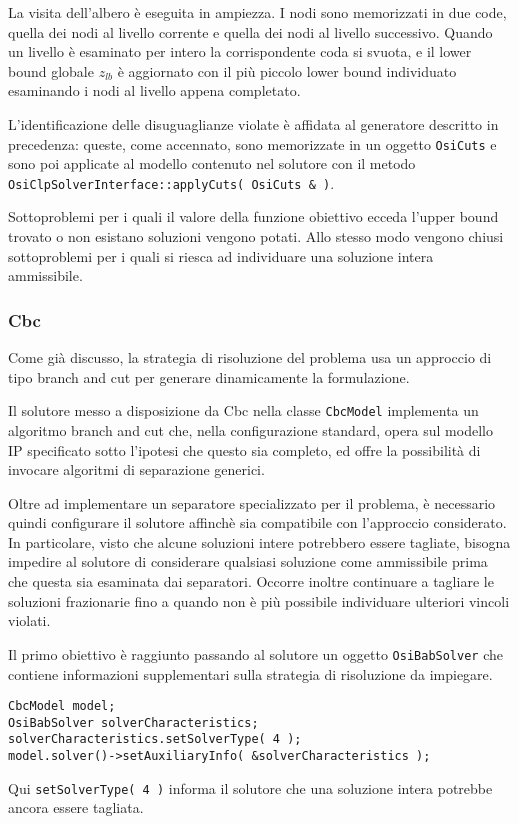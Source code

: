 \documentclass[11pt,oneside,a4paper]{article}
\begin{document}
La visita dell'albero è eseguita in ampiezza. I nodi sono
memorizzati in due code, quella dei nodi al livello corrente e quella dei nodi al livello
successivo. Quando un livello è esaminato per intero la corrispondente coda si svuota, e il lower bound
globale $z_{lb}$ è aggiornato con il più piccolo lower bound individuato esaminando i nodi al livello
appena completato.

L'identificazione delle disuguaglianze violate è affidata al generatore descritto in precedenza: 
queste, come accennato, sono memorizzate in un oggetto \texttt{OsiCuts} e sono poi applicate al modello
contenuto nel solutore con il metodo \texttt{Osi\-Clp\-Solver\-In\-ter\-fa\-ce::ap\-plyCuts( OsiCuts \& )}.

Sottoproblemi per i quali il valore della funzione obiettivo ecceda l'upper bound trovato
o non esistano soluzioni vengono potati. Allo stesso modo vengono chiusi sottoproblemi per
i quali si riesca ad individuare una soluzione intera ammissibile.

\subsubsection{Cbc}
Come già discusso, la strategia di risoluzione del problema usa un approccio di tipo branch and
cut per generare dinamicamente la formulazione.

Il solutore messo a disposizione da Cbc nella classe \texttt{CbcModel} implementa un algoritmo branch and cut
che, nella configurazione standard, opera sul modello IP specificato sotto l'ipotesi che questo sia
completo, ed offre la possibilità di invocare algoritmi di separazione generici.

Oltre ad implementare un separatore specializzato per il problema, è necessario quindi configurare il
solutore affinchè sia compatibile con l'approccio considerato. In particolare, visto che alcune
soluzioni intere potrebbero essere tagliate, bisogna impedire al solutore di considerare qualsiasi
soluzione come ammissibile prima che questa sia esaminata dai separatori. Occorre inoltre
continuare a tagliare le soluzioni frazionarie fino a quando non è più possibile
individuare ulteriori vincoli violati.

Il primo obiettivo è raggiunto passando al solutore un oggetto \texttt{OsiBabSol\-ver} che
contiene informazioni supplementari sulla strategia di risoluzione da impiegare.

\begin{verbatim}
CbcModel model;
OsiBabSolver solverCharacteristics;
solverCharacteristics.setSolverType( 4 );
model.solver()->setAuxiliaryInfo( &solverCharacteristics );
\end{verbatim}
Qui \texttt{setSolverType( 4 )} informa il solutore che una soluzione intera potrebbe ancora
essere tagliata.
\end{document}
